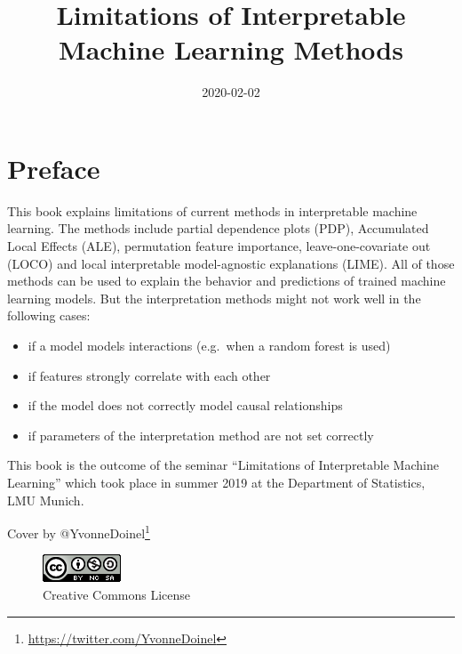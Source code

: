 \documentclass[]{krantz}
\title{Limitations of Interpretable Machine Learning Methods}
\author{}
\date{\vspace{-2.5em}2020-02-02}
\providecommand{\tightlist}{%
  \setlength{\itemsep}{0pt}\setlength{\parskip}{0pt}}
\renewcommand{\href}[2]{#2\footnote{\url{#1}}}
\begin{document}
\maketitle


\thispagestyle{empty}

\begin{center}
\end{center}

\setlength{\abovedisplayskip}{-5pt}
\setlength{\abovedisplayshortskip}{-5pt}

{
\hypersetup{linkcolor=black}
\setcounter{tocdepth}{0}
\tableofcontents
}
\chapter*{Preface}\label{preface}


This book explains limitations of current methods in interpretable
machine learning. The methods include partial dependence plots (PDP),
Accumulated Local Effects (ALE), permutation feature importance,
leave-one-covariate out (LOCO) and local interpretable model-agnostic
explanations (LIME). All of those methods can be used to explain the
behavior and predictions of trained machine learning models. But the
interpretation methods might not work well in the following cases:

\begin{itemize}
\tightlist
\item
  if a model models interactions (e.g.~when a random forest is used)
\item
  if features strongly correlate with each other
\item
  if the model does not correctly model causal relationships
\item
  if parameters of the interpretation method are not set correctly
\end{itemize}

This book is the outcome of the seminar ``Limitations of Interpretable
Machine Learning'' which took place in summer 2019 at the Department of
Statistics, LMU Munich.

Cover by \href{https://twitter.com/YvonneDoinel}{@YvonneDoinel}

\begin{figure}
\centering
\includegraphics{images/by-nc-sa.png}
\caption{Creative Commons License}
\end{figure}
\end{document}
